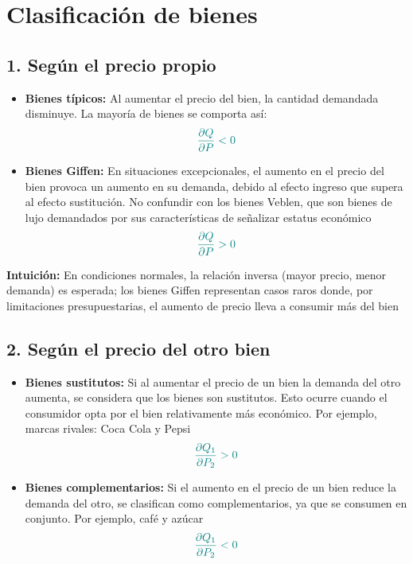 \documentclass{article}
\begin{document}
\section*{Clasificación de bienes}

\subsection*{1. Según el precio propio}
\begin{itemize}
    \item \textbf{\color{teal}Bienes típicos:} Al aumentar el precio del bien, la cantidad demandada disminuye. La mayoría de bienes se comporta así:
    \[\color{teal}
    \frac{\partial Q}{\partial P} < 0
    \]
    
    \item \textbf{\color{teal}Bienes Giffen:} En situaciones excepcionales, el aumento en el precio del bien provoca un aumento en su demanda, debido al efecto ingreso que supera al efecto sustitución. No confundir con los bienes Veblen, que son bienes de lujo demandados por sus características de señalizar estatus económico
    \[\color{teal}
    \frac{\partial Q}{\partial P} > 0
    \]
\end{itemize}

\textbf{Intuición:} En condiciones normales, la relación inversa (mayor precio, menor demanda) es esperada; los bienes Giffen representan casos raros donde, por limitaciones presupuestarias, el aumento de precio lleva a consumir más del bien

\subsection*{2. Según el precio del otro bien}
\begin{itemize}
    \item \textbf{\color{teal}Bienes sustitutos:} Si al aumentar el precio de un bien la demanda del otro aumenta, se considera que los bienes son sustitutos. Esto ocurre cuando el consumidor opta por el bien relativamente más económico. Por ejemplo, marcas rivales: Coca Cola y Pepsi
    \[\color{teal}
    \frac{\partial Q_1}{\partial P_2} > 0
    \]
    
    \item \textbf{\color{teal}Bienes complementarios:} Si el aumento en el precio de un bien reduce la demanda del otro, se clasifican como complementarios, ya que se consumen en conjunto. Por ejemplo, café y azúcar
    \[\color{teal}
    \frac{\partial Q_1}{\partial P_2} < 0
    \]
\end{itemize}
\end{document}
